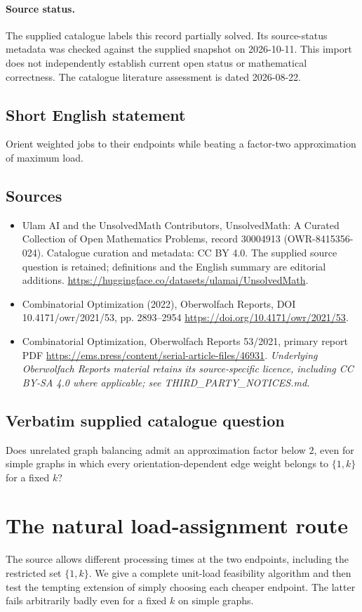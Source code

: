 \documentclass[11pt]{article}
\begin{document}
\paragraph{Source status.}
The supplied catalogue labels this record partially solved. Its source-status metadata was checked against the supplied snapshot on 2026-10-11. This import does not independently establish current open status or mathematical correctness. The catalogue literature assessment is dated 2026-08-22.
\subsection{Short English statement}
Orient weighted jobs to their endpoints while beating a factor-two approximation of maximum load.
\subsection{Sources}
\begin{itemize}
\item[S1] Ulam AI and the UnsolvedMath Contributors, UnsolvedMath: A Curated Collection of Open Mathematics Problems, record 30004913 (OWR-8415356-024). Catalogue curation and metadata: CC BY 4.0. The supplied source question is retained; definitions and the English summary are editorial additions.
\url{https://huggingface.co/datasets/ulamai/UnsolvedMath}.
\item[S2] Combinatorial Optimization (2022), Oberwolfach Reports, DOI 10.4171/owr/2021/53, pp. 2893--2954
\url{https://doi.org/10.4171/owr/2021/53}.
\item[S3] Combinatorial Optimization, Oberwolfach Reports 53/2021, primary report PDF
\url{https://ems.press/content/serial-article-files/46931}.
\textit{Underlying Oberwolfach Reports material retains its source-specific licence, including CC BY-SA 4.0 where applicable; see THIRD\_PARTY\_NOTICES.md.}
\end{itemize}
\subsection{Verbatim supplied catalogue question}
Does unrelated graph balancing admit an approximation factor below $2$, even for simple graphs in which every orientation-dependent edge weight belongs to $\{1,k\}$ for a fixed $k$?

\section{The natural load-assignment route}
The source allows different processing times at the two endpoints,
including the restricted set $\{1,k\}$. We give a complete
unit-load feasibility algorithm and then test the tempting extension
of simply choosing each cheaper endpoint. The latter fails arbitrarily
badly even for a fixed $k$ on simple graphs.
\end{document}

